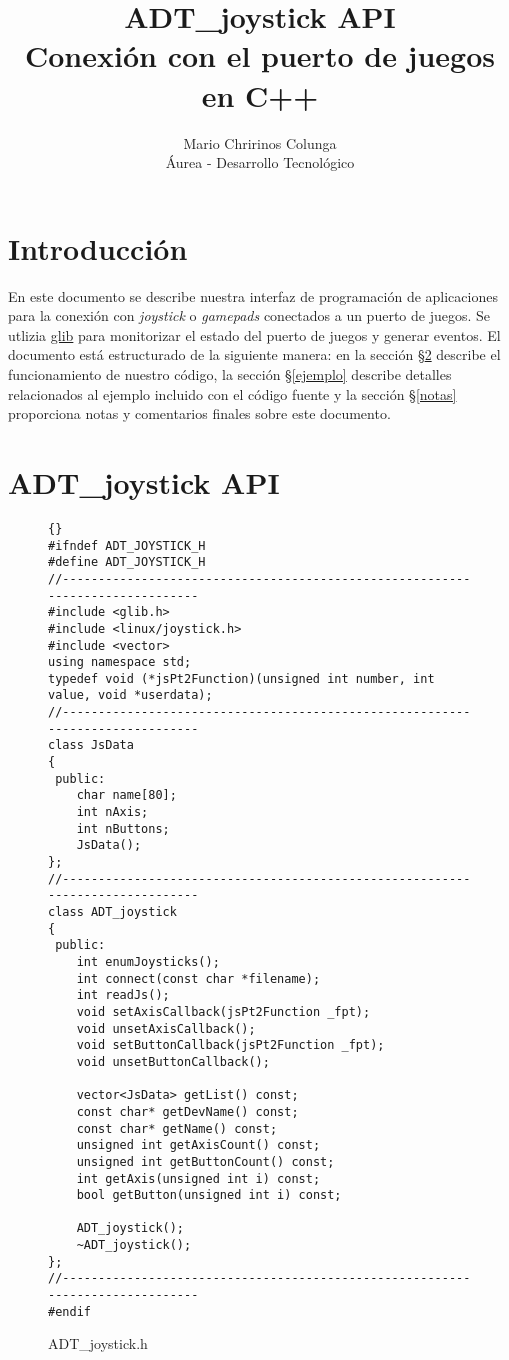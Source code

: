\documentclass[a4paper,10pt]{article}
\title{ADT\_joystick API\\ Conexión con el puerto de juegos en C++}
\author{Mario Chririnos Colunga\\ Áurea - Desarrollo Tecnológico}
\begin{document}
\maketitle

% 

\tableofcontents
\section{Introducción}
En este documento se describe nuestra interfaz de programación de aplicaciones para la conexión con \textit{joystick} o \textit{gamepads} conectados a un puerto de juegos. Se utlizia \href{http://library.gnome.org/devel/glib/}{glib} para monitorizar el estado del puerto de juegos y generar eventos. El documento está estructurado de la siguiente manera: en la sección \S\ref{api} describe el funcionamiento de nuestro código, la sección \S\ref{ejemplo} describe detalles relacionados al ejemplo incluido con el código fuente y la sección \S\ref{notas} proporciona notas y comentarios finales sobre este documento. 

\section{ADT\_joystick API}
\label{api}

\begin{figure}

  \lstset{language=c++}
  \lstset{commentstyle=\textit}
  \tiny
  \begin{lstlisting}[frame=trbl]{}
#ifndef ADT_JOYSTICK_H
#define ADT_JOYSTICK_H
//------------------------------------------------------------------------------
#include <glib.h>
#include <linux/joystick.h>
#include <vector>
using namespace std;
typedef void (*jsPt2Function)(unsigned int number, int value, void *userdata);
//------------------------------------------------------------------------------
class JsData
{
 public:
	char name[80];
	int nAxis;
	int nButtons;
	JsData();
};
//------------------------------------------------------------------------------
class ADT_joystick
{
 public:
	int enumJoysticks();
	int connect(const char *filename);
	int readJs();
	void setAxisCallback(jsPt2Function _fpt);
	void unsetAxisCallback();
	void setButtonCallback(jsPt2Function _fpt);
	void unsetButtonCallback();

	vector<JsData> getList() const;
	const char* getDevName() const;
	const char* getName() const;
	unsigned int getAxisCount() const;
	unsigned int getButtonCount() const;
	int getAxis(unsigned int i) const;
	bool getButton(unsigned int i) const;

	ADT_joystick();
	~ADT_joystick();
};
//------------------------------------------------------------------------------
#endif

  \end{lstlisting}
  \caption{ADT\_joystick.h}
  \label{joystick.h}
\end{figure}
\end{document}
